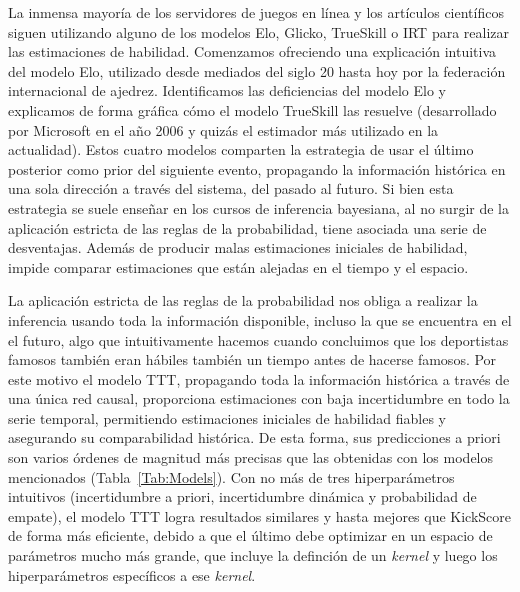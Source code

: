 \documentclass[a4paper,11pt]{book}
\theoremstyle{definition}
\begin{document}
La inmensa mayoría de los servidores de juegos en línea y los artículos científicos siguen utilizando alguno de los modelos Elo, Glicko, TrueSkill o IRT para realizar las estimaciones de habilidad.
%
Comenzamos ofreciendo una explicaci\'on intuitiva del modelo Elo, utilizado desde mediados del siglo 20 hasta hoy por la federaci\'on internacional de ajedrez.
%
Identificamos las deficiencias del modelo Elo y explicamos de forma gráfica c\'omo el modelo TrueSkill las resuelve (desarrollado por Microsoft en el año 2006 y quizás el estimador más utilizado en la actualidad).
%
%
%
Estos cuatro modelos comparten la estrategia de usar el último posterior como prior del siguiente evento, propagando la información histórica en una sola dirección a través del sistema, del pasado al futuro.
%
Si bien esta estrategia se suele enseñar en los cursos de inferencia bayesiana, al no surgir de la aplicación estricta de las reglas de la probabilidad, tiene asociada una serie de desventajas.
%
Además de producir malas estimaciones iniciales de habilidad, impide comparar estimaciones que están alejadas en el tiempo y el espacio.

La aplicación estricta de las reglas de la probabilidad nos obliga a realizar la inferencia usando toda la información disponible, incluso la que se encuentra en el el futuro, algo que intuitivamente hacemos cuando concluimos que los deportistas famosos también eran hábiles también un tiempo antes de hacerse famosos.
%
Por este motivo el modelo TTT, propagando toda la informaci\'on hist\'orica a través de una única red causal, proporciona estimaciones con baja incertidumbre en todo la serie temporal, permitiendo estimaciones iniciales de habilidad fiables y asegurando su comparabilidad hist\'orica.
%
De esta forma, sus predicciones a priori son varios \'ordenes de magnitud más precisas que las obtenidas con los modelos mencionados (Tabla~\ref{Tab:Models}).
%
Con no más de tres hiperparámetros intuitivos (incertidumbre a priori, incertidumbre dinámica y probabilidad de empate), el modelo TTT logra resultados similares y hasta mejores que KickScore de forma más eficiente, debido a que el \'ultimo debe optimizar en un espacio de parámetros mucho más grande, que incluye la definci\'on de un \emph{kernel} y luego los hiperparámetros específicos a ese \emph{kernel}.
\end{document}
